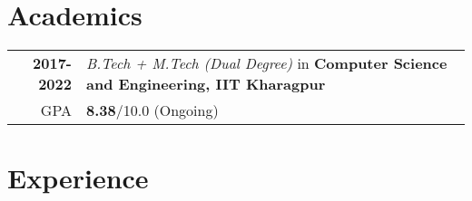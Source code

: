 \documentclass[a4paper,10pt]{extarticle} %
\begin{document}
\vspace{-0.4cm}
\section{\textcolor{primary}{Academics}}

\begin{tabular}{r|p{17.5cm}}	
\textbf{2017-2022} & \textit{B.Tech + M.Tech (Dual Degree)} in \textbf{Computer Science and Engineering, IIT Kharagpur}\\
\hfill GPA & \textbf{8.38}/10.0 (Ongoing)\\
\end{tabular}

\vspace{-0.3cm}
\section{\textcolor{primary}{Experience}}
\end{document}
